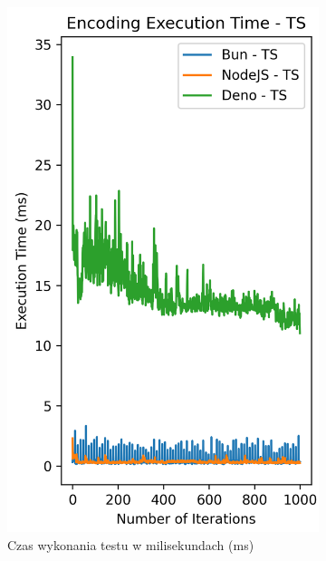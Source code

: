 \begin{figure}[H]
  \centering
  \begin{subfigure}[b]{0.42\textwidth}
    \centering
    \includegraphics[width=\textwidth]{Figures/coding/base64_1000_encoding_ts_time.png}
    \caption{Czas wykonania testu w milisekundach (ms)}
    \label{fig:encoding_e2_ts_time}
  \end{subfigure}
  \begin{subfigure}[b]{0.42\textwidth}
    \centering

\end{subfigure}
\end{figure}
